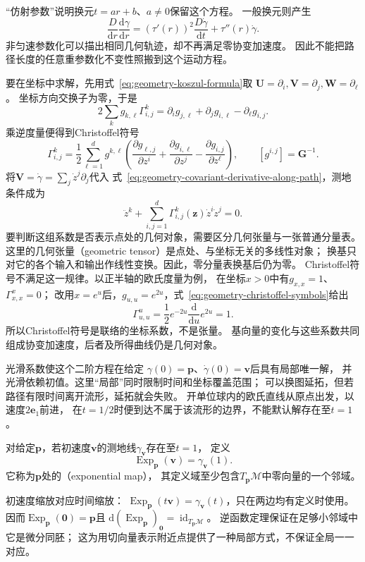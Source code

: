 “仿射参数”说明换元$t=ar+b$、$a\neq0$保留这个方程。
一般换元则产生
\[
 \frac{D}{\mathrm dr}\frac{\mathrm d\gamma}{\mathrm dr}
 =(\tau'(r))^2\frac{D\dot\gamma}{\mathrm dt}
   +\tau''(r)\dot\gamma.
\]
非匀速参数化可以描出相同几何轨迹，却不再满足零协变加速度。
因此不能把路径长度的任意重参数化不变性照搬到这个运动方程。

要在坐标中求解，先用式~\eqref{eq:geometry-koszul-formula}取
$\bm U=\partial_i,\bm V=\partial_j,\bm W=\partial_\ell$。
坐标方向交换子为零，于是
\[
 2\sum_k g_{k,\ell}\Gamma^k_{i,j}
 =\partial_i g_{j,\ell}+\partial_j g_{i,\ell}-\partial_\ell g_{i,j}.
\]
乘逆度量便得到Christoffel符号
\begin{equation}
 \Gamma^k_{i,j}
 =\frac12\sum_{\ell=1}^d g^{k,\ell}
  \left(\frac{\partial g_{\ell,j}}{\partial z^i}
       +\frac{\partial g_{i,\ell}}{\partial z^j}
       -\frac{\partial g_{i,j}}{\partial z^\ell}\right),
 \qquad [g^{i,j}]=\bm G^{-1}.
 \label{eq:geometry-christoffel-symbols}
\end{equation}
将$\bm V=\dot\gamma=\sum_j\dot z^j\partial_j$代入
式~\eqref{eq:geometry-covariant-derivative-along-path}，测地条件成为
\begin{equation}
 \ddot z^k+\sum_{i,j=1}^d
 \Gamma^k_{i,j}(\bm z)\dot z^i\dot z^j=0.
 \label{eq:geometry-geodesic-equation}
\end{equation}
要判断这组系数是否表示点处的几何对象，需要区分几何张量与一张普通分量表。
这里的几何张量（geometric tensor）是点处、与坐标无关的多线性对象；
换基只对它的各个输入和输出作线性变换。因此，零分量表换基后仍为零。
Christoffel符号不满足这一规律。以正半轴的欧氏度量为例，
在坐标$x>0$中有$g_{x,x}=1$、$\Gamma^x_{x,x}=0$；
改用$x=e^u$后，$g_{u,u}=e^{2u}$，式~\eqref{eq:geometry-christoffel-symbols}给出
\[
 \Gamma^u_{u,u}=\frac12 e^{-2u}\frac{\mathrm d}{\mathrm du}e^{2u}=1.
\]
所以Christoffel符号是联络的坐标系数，不是张量。
基向量的变化与这些系数共同组成协变加速度，后者及所得曲线仍是几何对象。

光滑系数使这个二阶方程在给定
$\gamma(0)=\bm p$、$\dot\gamma(0)=\bm v$后具有局部唯一解，
并光滑依赖初值。这里“局部”同时限制时间和坐标覆盖范围；
可以换图延拓，但若路径有限时间离开流形，延拓就会失败。
开单位球内的欧氏直线从原点出发，以速度$2\bm e_1$前进，
在$t=1/2$时便到达不属于该流形的边界，不能默认解存在至$t=1$。

\begin{definition}[指数映射]
\label{def:geometry-exponential-map}
对给定$\bm p$，若初速度$\bm v$的测地线$\gamma_{\bm v}$存在至$t=1$，
定义
\[
 \operatorname{Exp}_{\bm p}(\bm v)=\gamma_{\bm v}(1).
\]
它称为$\bm p$处的（exponential map），
其定义域至少包含$T_{\bm p}\mathcal M$中零向量的一个邻域。
\end{definition}
初速度缩放对应时间缩放：
$\operatorname{Exp}_{\bm p}(t\bm v)=\gamma_{\bm v}(t)$，只在两边均有定义时使用。
因而$\operatorname{Exp}_{\bm p}(\bm0)=\bm p$且
$\mathrm d(\operatorname{Exp}_{\bm p})_{\bm0}=\operatorname{id}_{T_{\bm p}\mathcal M}$。
逆函数定理保证在足够小邻域中它是微分同胚；
这为用切向量表示附近点提供了一种局部方式，不保证全局一一对应。

